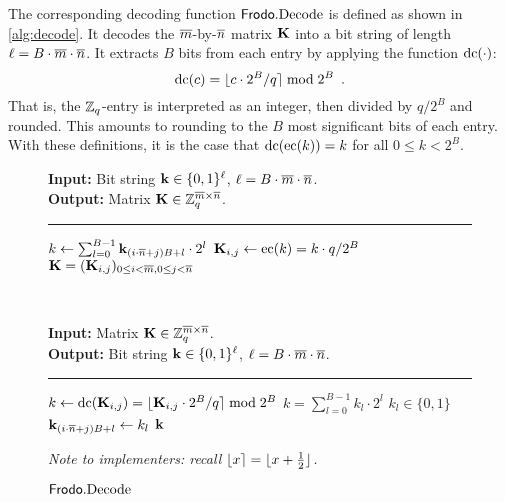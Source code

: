 \documentclass{iacrcc}
\begin{document}
The corresponding decoding function $\textsf{\upshape\mdseries Frodo}.\textrm{\upshape\mdseries Decode}$ is defined as shown in
\autoref{alg:decode}. It decodes the $\overline{m}$-by-$\overline{n}$ matrix $\mathbf{K}$ into a
bit string of length $\ell=B\cdot\overline{m}\cdot\overline{n}$. It extracts $B$ bits from
each entry by applying the function $\textrm{\upshape\mdseries dc}(\cdot)$:
\[ \textrm{\upshape\mdseries dc}(c) = \lfloor c \cdot 2^B/q\rceil \bmod 2^B \enspace . \]
That is, the $\mathbb{Z}_{q}$-entry is interpreted as an integer, then
divided by $q/2^B$ and rounded. This amounts to rounding to the $B$
most significant bits of each entry. With these definitions, it is the case that $\textrm{\upshape\mdseries dc}(\textrm{\upshape\mdseries ec}(k)) = k$ for all $0\leq k < 2^B$.

\begin{figure}[h!]
\centering
\begin{minipage}[t]{0.45\textwidth}
\begin{algorithm}[H]
\caption{\label{alg:encode} $\Frodo.\Encode$}
{\bf Input:} Bit string $\mathbf{k}\in \{0,1\}^\ell$, $\ell = B\cdot\overline{m}\cdot\overline{n}$.\\
{\bf Output:} Matrix $\mathbf{K} \in \mathbb{Z}_q^{\overline{m} \times \overline{n}}$.\\[-1.5ex]
\rule{\linewidth}{.5pt}
\vspace{-0.5cm}
\begin{algorithmic}[1]
    \STATE $k \gets \sum_{l=0}^{B-1}\mathbf{k}_{(i\cdot \overline{n} + j)B+l}\cdot 2^l$
    \STATE $\mathbf{K}_{i,j} \gets \textrm{\upshape\mdseries ec}(k)= k\cdot q/2^B$
    \ENDFOR
    \ENDFOR
    \RETURN$\mathbf{K} = (\mathbf{K}_{i,j})_{0\leq i < \overline{m}, 0 \leq j < \overline{n}}$
\end{algorithmic}
\end{algorithm}
\end{minipage}
~
\begin{minipage}[t]{0.45\textwidth}
\begin{algorithm}[H]
\caption{\label{alg:decode} $\textsf{\upshape\mdseries Frodo}.\textrm{\upshape\mdseries Decode}$}
{\bf Input:} Matrix $\mathbf{K} \in \mathbb{Z}_q^{\overline{m}\times\overline{n}}$.\\
{\bf Output:} Bit string $\mathbf{k} \in \{0,1\}^\ell$, $\ell = B\cdot\overline{m}\cdot\overline{n}$.\\[-1.5ex]
\rule{\linewidth}{.5pt}
\vspace{-0.5cm}
\begin{algorithmic}[1]
    \STATE $k \gets \textrm{\upshape\mdseries dc}(\mathbf{K}_{i,j})= \lfloor\mathbf{K}_{i,j}\cdot 2^B/q\rceil \bmod 2^B$
    \STATE $k = \sum_{l=0}^{B-1}k_l \cdot 2^l$  $k_l\in \{0,1\}$
    \STATE $\mathbf{k}_{(i\cdot \overline{n} + j)B+l} \gets k_l$ 
    \ENDFOR
    \ENDFOR
    \ENDFOR
    \RETURN$\mathbf{k}$
\end{algorithmic}
\end{algorithm}
\vspace{-0.5em}
\textit{Note to implementers: recall $\lfloor x\rceil = \lfloor x + \frac{1}{2} \rfloor$.}
\end{minipage}
\end{figure}
\end{document}
